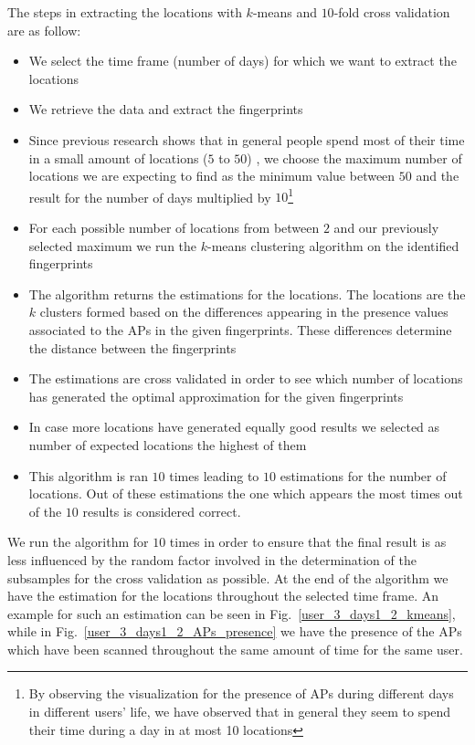 The steps in extracting the locations with $k$-means and $10$-fold cross
validation are as follow:
\begin{itemize}
  \item We select the time frame (number of days) for which we want to extract
  the locations
  \item We retrieve the data and extract the fingerprints
  \item Since previous research shows that in general people spend most of their
  time in a small amount of locations ($5$ to $50$) \cite{Barabasi08}, we choose
  the maximum number of locations we are expecting to find as the minimum value
  between $50$ and the result for the number of days multiplied by
  $10$\footnote{By observing the visualization for the presence of APs during
  different days in different users' life, we have observed that in general
  they seem to spend their time during a day in at most 10 locations}
  \item For each possible number of locations from between $2$ and our
  previously selected maximum we run the $k$-means clustering algorithm on the
  identified fingerprints
  \item The algorithm returns the estimations for the locations. The locations
  are the $k$ clusters formed based on the differences appearing in the presence
  values associated to the APs in the given fingerprints. These differences
  determine the distance between the fingerprints
  \item The estimations are cross validated in order to see which number of
  locations has generated the optimal approximation for the given fingerprints
  \item In case more locations have generated equally good results we selected
  as number of expected locations the highest of them
  \item This algorithm is ran $10$ times leading to $10$ estimations for the
  number of locations. Out of these estimations the one which appears the most times
  out of the $10$ results is considered correct.
\end{itemize}

We run the algorithm for $10$ times in order to ensure that the final result
is as less influenced by the random factor involved in the determination of the
subsamples for the cross validation as possible. At the end of the algorithm we
have the estimation for the locations throughout the selected time frame. An
example for such an estimation can be seen in Fig.~\ref{user_3_days1_2_kmeans},
while in Fig.~\ref{user_3_days1_2_APs_presence} we have the presence of the APs
which have been scanned throughout the same amount of time for the same user.

